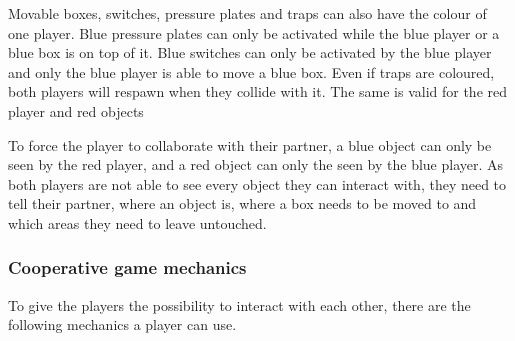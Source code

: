 Movable boxes, switches, pressure plates and traps can also have the colour of one player. 
Blue pressure plates can only be activated while the blue player or a blue box is on top of it.
Blue switches can only be activated by the blue player and only the blue player is able to move a blue box.
Even if traps are coloured, both players will respawn when they collide with it.
The same is valid for the red player and red objects

To force the player to collaborate with their partner, a blue object can only be seen by the red player, and a red object can only the seen by the blue player. As both players are not able to see every object they can interact with, they need to tell their partner, where an object is, where a box needs to be moved to and which areas they need to leave untouched.

\subsubsection{Cooperative game mechanics}
\label{Cooperative game mechanics}

To give the players the possibility to interact with each other, there are the following mechanics a player can use.

